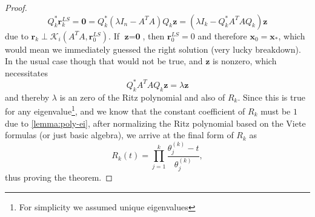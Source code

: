 \documentclass{article}
\begin{document}
\begin{proof}
		\begin{equation}
			Q_k^\ast \mathbf{r}_k^{LS} = \textbf{0} =
				Q_k^\ast\left(\lambda I_{n} - A^T A \right)Q_k \textbf{z} = \left(\lambda I_{k} - Q_k^\ast A^T A Q_k  \right)\textbf{z}
		\end{equation}
		due to $\textbf{r}_k \perp  \mathcal{K}_i \left(A^T A,\textbf{r}_0^{LS} \right)$. If $\textbf{z} = \textbf{0}$, then $\textbf{r}_0^{LS} = 0 $ and therefore $\textbf{x}_0 = \textbf{x}_*$, which would mean we immediately guessed the right solution (very lucky breakdown). In the usual case though that would not be true, and $\textbf{z}$ is nonzero, which necessitates
		\begin{equation}
				Q_k^{\ast}A^{T} A Q_k \textbf{z} = \lambda \textbf{z}
		\end{equation}
		and thereby $\lambda$ is an zero of the Ritz polynomial and also of $R_k$. Since this is true for any eigenvalue\footnote{For simplicity we assumed unique eigenvalues},
		 and we know that the constant coefficient of $R_k$ must be $1$ due to \autoref{lemma:poly-ei}, after normalizing the Ritz polynomial based on the Viete formulas (or just basic algebra), we arrive at the final form of $R_k$ as 
		\begin{equation}
			R_k(t)=\prod_{j=1}^{k}\frac{\theta_j^{(k)}-t}{\theta_j^{(k)}},
		\end{equation}
		thus proving the theorem.
	\end{proof}
	\newpage
	

\FloatBarrier
\newpage
\printbibliography
\end{document}
